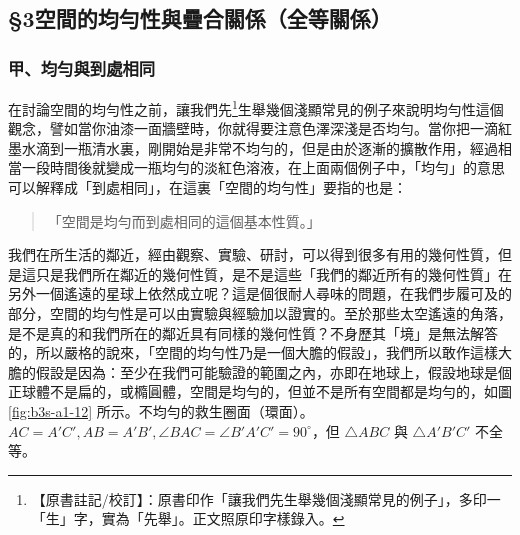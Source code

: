 \subsection*{\S 3\quad 空間的均勻性與疊合關係（全等關係）}
\label{sec:b3s_a1_3}

\subsubsection*{甲、均勻與到處相同}

在討論空間的均勻性之前，讓我們先\label{note:b3s-a1-p268-xian}\footnote{【原書註記/校訂】：原書印作「讓我們先生舉幾個淺顯常見的例子」，多印一「生」字，實為「先舉」。正文照原印字樣錄入。}生舉幾個淺顯常見的例子來說明均勻性這個觀念，譬如當你油漆一面牆壁時，你就得要注意色澤深淺是否均勻。當你把一滴紅墨水滴到一瓶清水裏，剛開始是非常不均勻的，但是由於逐漸的擴散作用，經過相當一段時間後就變成一瓶均勻的淡紅色溶液，在上面兩個例子中，「均勻」的意思可以解釋成「到處相同」，在這裏「空間的均勻性」要指的也是：
\begin{quote}
  「空間是均勻而到處相同的這個基本性質。」
\end{quote}

我們在所生活的鄰近，經由觀察、實驗、研討，可以得到很多有用的幾何性質，但是這只是我們所在鄰近的幾何性質，是不是這些「我們的鄰近所有的幾何性質」在另外一個遙遠的星球上依然成立呢？這是個很耐人尋味的問題，在我們步履可及的部分，空間的均勻性是可以由實驗與經驗加以證實的。至於那些太空遙遠的角落，是不是真的和我們所在的鄰近具有同樣的幾何性質？不身歷其「境」是無法解答的，所以嚴格的說來，「空間的均勻性乃是一個大膽的假設」，我們所以敢作這樣大膽的假設是因為：至少在我們可能驗證的範圍之內，亦即在地球上，假設地球是個正球體不是扁的，或橢圓體，空間是均勻的，但並不是所有空間都是均勻的，如圖 \ref{fig:b3s-a1-12} 所示。不均勻的救生圈面（環面）。$AC = A'C', AB = A'B', \angle BAC = \angle B'A'C' = 90^\circ$，但 $\triangle ABC$ 與 $\triangle A'B'C'$ 不全等。

